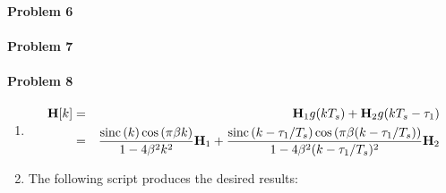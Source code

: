\documentclass[12pt]{article}
\begin{document}
\paragraph{Problem 6}

\paragraph{Problem 7}

\paragraph{Problem 8}
\begin{enumerate}
\item
\begin{eqnarray*}
{\bf H}[k]&=&{\bf H}_1g(kT_s)+{\bf H}_2g(kT_s-\tau_1)\\
&=&\frac{\mbox{sinc}\left(k\right)\cos\left(\pi\beta
k\right)}{1-4\beta^2 k^2}{\bf H}_1+
\frac{\mbox{sinc}\left(k-\tau_1/T_s\right)\cos\left(\pi\beta
(k-\tau_1/T_s)\right)}{1-4\beta^2 (k-\tau_1/T_s)^2} {\bf H}_2
\end{eqnarray*}

\item  The following script produces the desired results:

%
\end{enumerate}
\end{document}
